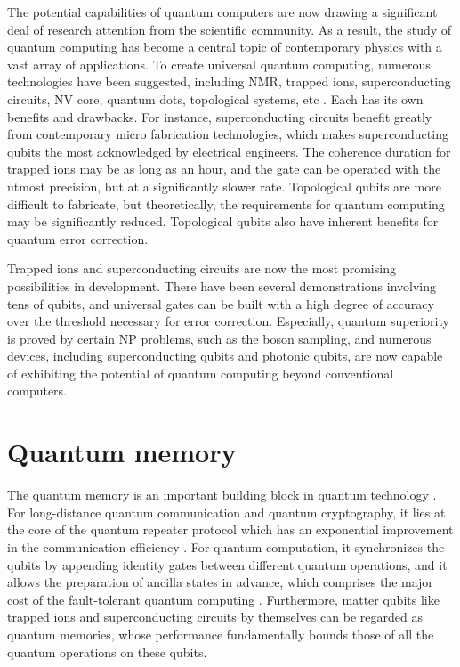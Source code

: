 The potential capabilities of quantum computers \cite{Benioff1980,Feynman1982} are now drawing a significant deal of research attention from the scientific community. As a result, the study of quantum computing has become a central topic of contemporary physics with a vast array of applications. To create universal quantum computing, numerous technologies have been suggested, including NMR, trapped ions, superconducting circuits, NV core, quantum dots, topological systems, etc \cite{Ladd2010}. Each has its own benefits and drawbacks. For instance, superconducting circuits benefit greatly from contemporary micro fabrication technologies, which makes superconducting qubits the most acknowledged by electrical engineers. The coherence duration for trapped ions may be as long as an hour, and the gate can be operated with the utmost precision, but at a significantly slower rate. Topological qubits are more difficult to fabricate, but theoretically, the requirements for quantum computing may be significantly reduced. Topological qubits also have inherent benefits for quantum error correction.

Trapped ions and superconducting circuits are now the most promising possibilities in development. There have been several demonstrations involving tens of qubits, and universal gates can be built with a high degree of accuracy over the threshold necessary for error correction. Especially, quantum superiority is proved by certain NP problems, such as the boson sampling, and numerous devices, including superconducting qubits and photonic qubits, are now capable of exhibiting the potential of quantum computing beyond conventional computers.


\section{Quantum memory}

The quantum memory is an important building block in quantum technology \cite{lvovsky2009optical}. For long-distance quantum communication and quantum cryptography, it lies at the core of the quantum repeater protocol which has an exponential improvement in the communication efficiency \cite{duan2001long, sangouard2011quantum}. For quantum computation, it synchronizes the qubits by appending identity gates between different quantum operations, and it allows the preparation of ancilla states in advance, which comprises the major cost of the fault-tolerant quantum computing \cite{gottesman1998theory,campbell2017roads}. Furthermore, matter qubits like trapped ions and superconducting circuits \cite{huang2020superconducting} by themselves can be regarded as quantum memories, whose performance fundamentally bounds those of all the quantum operations on these qubits.

